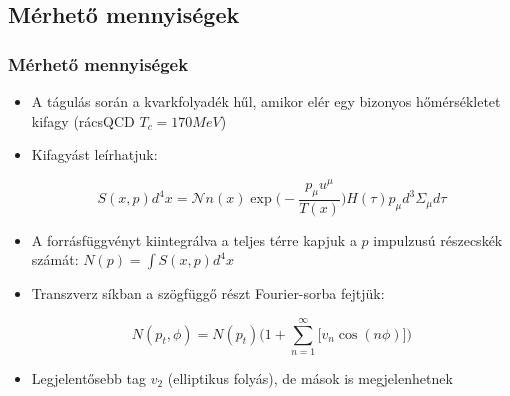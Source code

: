\documentclass{beamer}
\begin{document}
\subsection{Mérhető mennyiségek}
\begin{frame}
\frametitle{Mérhető mennyiségek}
\begin{itemize}
\item A tágulás során a kvarkfolyadék hűl, amikor elér egy bizonyos hőmérsékletet kifagy  (rácsQCD $T_c = 170 MeV$)
\item Kifagyást leírhatjuk:
\begin{center}
\begin{equation}
S(x, p)d^4x=\mathcal{N}n(x)\exp{\bigg(-\frac{p_\mu u^\mu}{T(x)}\bigg)}H(\tau)p_\mu d^3\Sigma_\mu d\tau
\end{equation}
\end{center}

\item A forrásfüggvényt kiintegrálva a teljes térre kapjuk a $p$ impulzusú részecskék számát: $N(p)=\int S(x, p)d^4x$
\item Transzverz síkban a szögfüggő részt Fourier-sorba fejtjük:
\begin{center}
\begin{equation}
N(p_t, \phi)= N(p_t)\bigg(1+\sum_{n=1}^{\infty}\Big[v_n \cos(n\phi)\Big]\bigg)
\end{equation}
\end{center}
\item Legjelentősebb tag $v_2$ (elliptikus folyás), de mások is megjelenhetnek
\end{itemize}
\end{frame}
\end{document}
